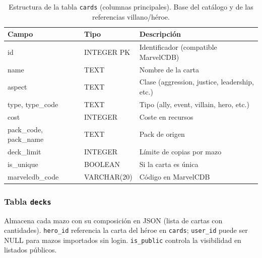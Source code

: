 \begin{table}[H]
    \centering
    \small
    \begin{tabular}{|l|l|l|}
        \hline
        \textbf{Campo} & \textbf{Tipo} & \textbf{Descripción} \\
        \hline
        id & INTEGER PK & Identificador (compatible MarvelCDB) \\
        name & TEXT & Nombre de la carta \\
        aspect & TEXT & Clase (aggression, justice, leadership, etc.) \\
        type, type\_code & TEXT & Tipo (ally, event, villain, hero, etc.) \\
        cost & INTEGER & Coste en recursos \\
        pack\_code, pack\_name & TEXT & Pack de origen \\
        deck\_limit & INTEGER & Límite de copias por mazo \\
        is\_unique & BOOLEAN & Si la carta es única \\
        marvelcdb\_code & VARCHAR(20) & Código en MarvelCDB \\
        \hline
    \end{tabular}
    \caption{Estructura de la tabla \texttt{cards} (columnas principales). Base del catálogo y de las referencias villano/héroe.}
    \label{tab:cards}
\end{table}

\subsubsection{Tabla \texttt{decks}}

Almacena cada mazo con su composición en JSON (lista de cartas con cantidades). \texttt{hero\_id} referencia la carta del héroe en \texttt{cards}; \texttt{user\_id} puede ser NULL para mazos importados sin login. \texttt{is\_public} controla la visibilidad en listados públicos.

